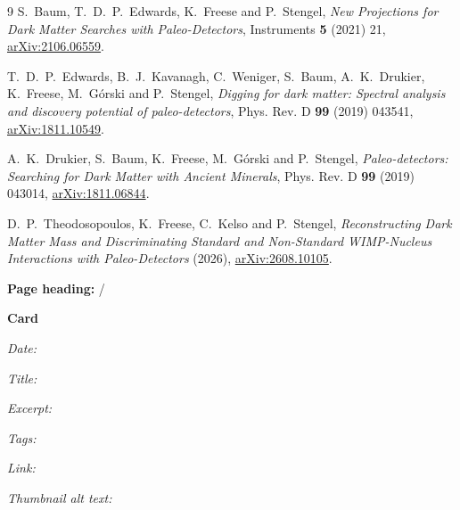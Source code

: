\documentclass[11pt]{article}
\newcommand{\indexcard}{%
  \begin{tcolorbox}[colback=green!4,colframe=green!45!black,
                    title={Listing page: \texttt{blog.html}}]
  \textbf{Page heading:} \theindexpretitle{} / \theindextitle

  \medskip
  \textbf{Card}\par
  \textit{Date:} \thepostdate\par
  \textit{Title:} \theposttitle\par
  \textit{Excerpt:} \thepostexcerpt\par
  \textit{Tags:} \theposttags\par
  \textit{Link:} \thepostmore\par
  \textit{Thumbnail alt text:} \thepostthumbalt
  \end{tcolorbox}}
\begin{document}
\begin{thebibliography}{9}
S.~Baum, T.~D.~P.~Edwards, K.~Freese and P.~Stengel, \emph{New Projections for
Dark Matter Searches with Paleo-Detectors}, Instruments \textbf{5} (2021) 21,
\href{https://arxiv.org/abs/2106.06559}{arXiv:2106.06559}.

T.~D.~P.~Edwards, B.~J.~Kavanagh, C.~Weniger, S.~Baum, A.~K.~Drukier,
K.~Freese, M.~G\'orski and P.~Stengel, \emph{Digging for dark matter: Spectral
analysis and discovery potential of paleo-detectors}, Phys. Rev. D \textbf{99}
(2019) 043541, \href{https://arxiv.org/abs/1811.10549}{arXiv:1811.10549}.

A.~K.~Drukier, S.~Baum, K.~Freese, M.~G\'orski and P.~Stengel,
\emph{Paleo-detectors: Searching for Dark Matter with Ancient Minerals},
Phys. Rev. D \textbf{99} (2019) 043014,
\href{https://arxiv.org/abs/1811.06844}{arXiv:1811.06844}.

D.~P.~Theodosopoulos, K.~Freese, C.~Kelso and P.~Stengel, \emph{Reconstructing
Dark Matter Mass and Discriminating Standard and Non-Standard WIMP-Nucleus
Interactions with Paleo-Detectors} (2026),
\href{https://arxiv.org/abs/2608.10105}{arXiv:2608.10105}.

\end{thebibliography}

\indexcard
\end{document}
